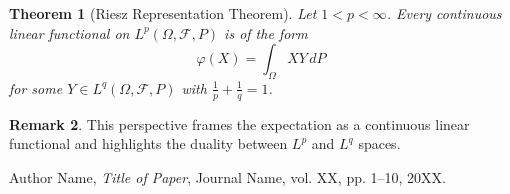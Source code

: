 \documentclass[11pt,reqno]{amsart}
\newtheorem{theorem}{Theorem}[section]
\theoremstyle{definition}
\newtheorem{remark}[theorem]{Remark}
\theoremstyle{remark}
\begin{document}
\begin{theorem}[Riesz Representation Theorem]
	Let $1 < p < \infty$. Every continuous linear functional on $L^p(\Omega, \mathcal{F}, P)$ is of the form
	\[
		\varphi(X) = \int_\Omega X Y \, dP
	\]
	for some $Y \in L^q(\Omega, \mathcal{F}, P)$ with $\frac{1}{p} + \frac{1}{q}=1$.
\end{theorem}

\begin{remark}
	This perspective frames the expectation as a continuous linear functional and highlights the duality between $L^p$ and $L^q$ spaces.
\end{remark}


\begin{thebibliography}{9}

	Author Name, \emph{Title of Paper}, Journal Name, vol. XX, pp. 1--10, 20XX.

\end{thebibliography}
\end{document}
